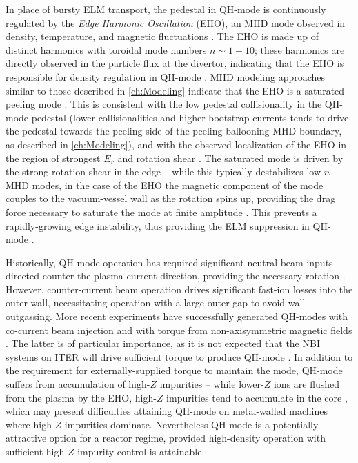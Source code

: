 In place of bursty ELM transport, the pedestal in QH-mode is continuously regulated by the \emph{Edge Harmonic Oscillation} (EHO), an MHD mode observed in density, temperature, and magnetic fluctuations \cite{Burrell2002}.  The EHO is made up of distinct harmonics with toroidal mode numbers $n \sim 1-10$; these harmonics are directly observed in the particle flux at the divertor, indicating that the EHO is responsible for density regulation in QH-mode \cite{Doyle2001}.  MHD modeling approaches similar to those described in \cref{ch:Modeling} indicate that the EHO is a saturated peeling mode \cite{Snyder2007,Osborne2008,Snyder2012}.  This is consistent with the low pedestal collisionality in the QH-mode pedestal (lower collisionalities and higher bootstrap currents tends to drive the pedestal towards the peeling side of the peeling-ballooning MHD boundary, as described in \cref{ch:Modeling}), and with the observed localization of the EHO in the region of strongest $E_r$ and rotation shear \cite{Burrell2001}.  
The saturated mode is driven by the strong rotation shear in the edge -- while this typically destabilizes low-$n$ MHD modes, in the case of the EHO the magnetic component of the mode couples to the vacuum-vessel wall as the rotation spins up, providing the drag force necessary to saturate the mode at finite amplitude \cite{Burrell2009}.  This prevents a rapidly-growing edge instability, thus providing the ELM suppression in QH-mode \cite{Snyder2012}.

Historically, QH-mode operation has required significant neutral-beam inputs directed counter the plasma current direction, providing the necessary rotation \cite{Burrell2002}.  However, counter-current beam operation drives significant fast-ion losses into the outer wall, necessitating operation with a large outer gap to avoid wall outgassing.  More recent experiments have successfully generated QH-modes with co-current beam injection \cite{Burrell2009} and with torque from non-axisymmetric magnetic fields \cite{Garofalo2011,Burrell2013}.  The latter is of particular importance, as it is not expected that the NBI systems on ITER will drive sufficient torque to produce QH-mode \cite{Garofalo2011}.  In addition to the requirement for externally-supplied torque to maintain the mode, QH-mode suffers from accumulation of high-$Z$ impurities -- while lower-$Z$ ions are flushed from the plasma by the EHO, high-$Z$ impurities tend to accumulate in the core \cite{Doyle2001,Suttrop2005}, which may present 
difficulties attaining QH-mode on metal-walled machines where high-$Z$ impurities dominate.  Nevertheless QH-mode is a potentially attractive option for a reactor regime, provided high-density operation with sufficient high-$Z$ impurity control is attainable.

